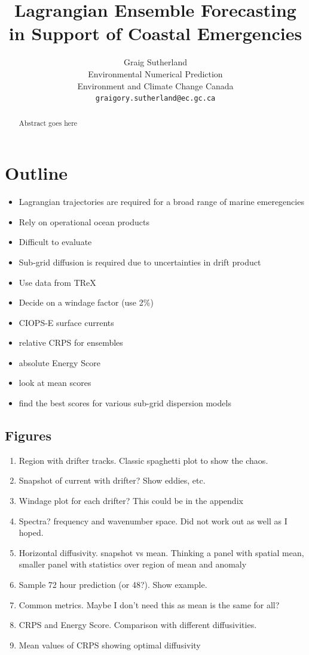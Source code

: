 \documentclass{article}
\title{Lagrangian Ensemble Forecasting in Support of Coastal Emergencies}
\author{
  Graig Sutherland\\
  Environmental Numerical Prediction\\
  Environment and Climate Change Canada\\
  \texttt{graigory.sutherland@ec.gc.ca} \\
}
\begin{document}
\maketitle

\begin{abstract}

	Abstract goes here

\end{abstract}



\section{Outline}
\begin{itemize}
	\item Lagrangian trajectories are required for a broad range of marine emeregencies
	\item Rely on operational ocean products
	\item Difficult to evaluate
	\item Sub-grid diffusion is required due to uncertainties in drift product
	\item Use data from TReX 
	\item Decide on a windage factor (use 2\%)
	\item CIOPS-E surface currents
	\item relative CRPS for ensembles
	\item absolute Energy Score
	\item look at mean scores
	\item find the best scores for various sub-grid dispersion models
\end{itemize}
\subsection{Figures}
\begin{enumerate}
	\item Region with drifter tracks. Classic spaghetti plot to show the chaos.
	\item Snapshot of current with drifter? Show eddies, etc.
	\item Windage plot for each drifter? This could be in the appendix
	\item Spectra? frequency and wavenumber space. Did not work out as well as I hoped.
	\item Horizontal diffusivity. snapshot vs mean. Thinking a panel with spatial mean, smaller panel with statistics over region of mean and anomaly
	\item Sample 72 hour prediction (or 48?). Show example.
	\item Common metrics. Maybe I don't need this as mean is the same for all?
	\item CRPS and Energy Score. Comparison with different diffusivities. 
	\item Mean values of CRPS showing optimal diffusivity
\end{enumerate}
\end{document}
